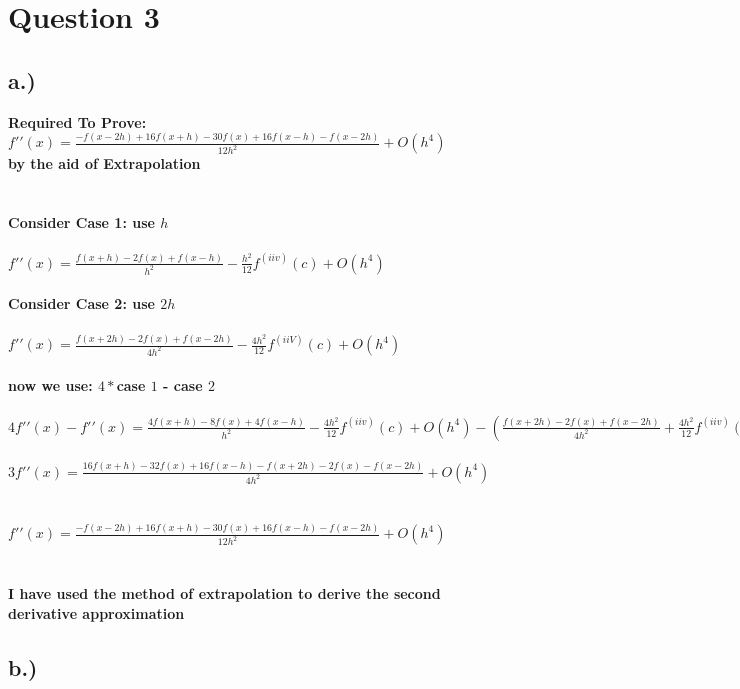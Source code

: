 \documentclass{article}
\begin{document}
\pagebreak
\section*{Question 3}
\subsection*{a.)}

\textbf{Required To Prove: \\ $f{\prime \prime}(x) = \frac{-f(x - 2h) + 16f(x + h) - 30f(x) + 16f(x - h) - f(x - 2h)}{12h^2} + O(h^4)$\\  by the aid of Extrapolation\\ \\ \\ }
\textbf{Consider Case 1: use $h$ \\ \\ 
$f{\prime \prime}(x) = \frac{f(x + h) - 2f(x) + f(x - h)}{h^2} - \frac{h^2}{12}f^{(iiv)}(c) + O(h^4)$ \\ \\}
\textbf{Consider Case 2: use $2h$ \\ \\ $f{\prime \prime}(x) = \frac{f(x + 2h) - 2f(x) + f(x - 2h)}{4h^2} - \frac{4h^2}{12}f^{(iiV)}(c) + O(h^4)$ \\ \\ now we use: $4*$case $1$ - case $2$ \\ \\ }
\textbf{$4f{\prime \prime}(x) - f{\prime \prime}(x) = \frac{4f(x + h) - 8f(x) + 4f(x - h)}{h^2} - \frac{4h^2}{12}f^{(iiv)}(c) + O(h^4) - ( \frac{f(x+2h) - 2f(x) + f(x-2h)}{4h^2}+ \frac{4h^2}{12}f^{(iiv)}(c) + O(h^4))$\\ \\ $3f{\prime \prime}(x) = \frac{16f(x + h) - 32f(x) + 16f(x-h) - f(x +2h) - 2f(x) - f(x - 2h)}{4h^2} + O(h^4)$ \\ \\ \\ $f{\prime \prime}(x) = \frac{-f(x-2h) + 16f(x+h) - 30f(x) + 16f(x-h) - f(x-2h)}{12h^2} + O(h^4)$ \\ \\ \\ I have used the method of extrapolation to derive the second derivative approximation}



\pagebreak
\subsection*{b.)}
\end{document}
